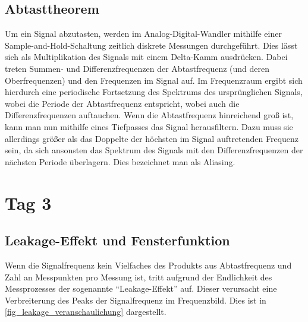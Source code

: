 \documentclass[
a4paper,
12pt,
pagesize,
ngerman
]{scrartcl}
\begin{document}
	\subsection{Abtasttheorem}
	Um ein Signal abzutasten, werden im Analog-Digital-Wandler mithilfe einer Sample-and-Hold-Schaltung zeitlich diskrete Messungen durchgeführt.
	Dies lässt sich als Multiplikation des Signals mit einem Delta-Kamm ausdrücken.
	Dabei treten Summen- und Differenzfrequenzen der Abtastfrequenz (und deren Oberfrequenzen) und den Frequenzen im Signal auf.
	Im Frequenzraum ergibt sich hierdurch eine periodische Fortsetzung des Spektrums des ursprünglichen Signals, wobei die Periode der Abtastfrequenz entspricht, wobei auch die Differenzfrequenzen auftauchen. %
	Wenn die Abtastfrequenz hinreichend groß ist, kann man nun mithilfe eines Tiefpasses das Signal herausfiltern.
	Dazu muss sie allerdings größer als das Doppelte der höchsten im Signal auftretenden Frequenz sein, da sich ansonsten das Spektrum des Signals mit den Differenzfrequenzen der nächsten Periode überlagern.
	Dies bezeichnet man als Aliasing.
	
	
	\section{Tag 3}
	\subsection{Leakage-Effekt und Fensterfunktion}
	\label{leakage}
	Wenn die Signalfrequenz kein Vielfaches des Produkts aus Abtastfrequenz und Zahl an Messpunkten pro Messung ist, tritt aufgrund der Endlichkeit des Messprozesses der sogenannte \enquote{Leakage-Effekt} auf.
	Dieser verursacht eine Verbreiterung des Peaks der Signalfrequenz im Frequenzbild.
	Dies ist in \cref{fig_leakage_veranschaulichung} dargestellt.
	
\end{document}

